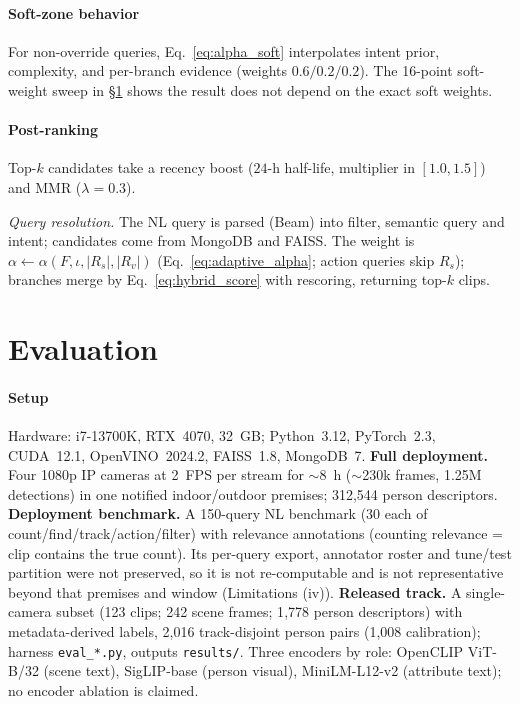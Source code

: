 ﻿\documentclass[conference]{IEEEtran}
\theoremstyle{plain}
\begin{document}
\paragraph*{Soft-zone behavior}
For non-override queries, Eq.~\eqref{eq:alpha_soft} interpolates intent prior, complexity, and per-branch evidence (weights $0.6/\allowbreak 0.2/\allowbreak 0.2$). The 16-point soft-weight sweep in \S\ref{sec:eval} shows the result does not depend on the exact soft weights.

\paragraph*{Post-ranking}
Top-$k$ candidates take a recency boost ($24$-h half-life, multiplier in $[1.0,1.5]$) and MMR ($\lambda{=}0.3$).

\emph{Query resolution.} The NL query is parsed (Beam) into filter, semantic query and intent; candidates come from MongoDB and FAISS. The weight is $\alpha\leftarrow\alpha(F,\iota,|R_s|,|R_v|)$ (Eq.~\eqref{eq:adaptive_alpha}; action queries skip $R_s$); branches merge by Eq.~\eqref{eq:hybrid_score} with rescoring, returning top-$k$ clips.

\section{Evaluation}\label{sec:eval}

\paragraph*{Setup}
Hardware: i7-13700K, RTX~4070, 32~GB; Python~3.12, PyTorch~2.3, CUDA~12.1, OpenVINO~2024.2, FAISS~1.8, MongoDB~7. \textbf{Full deployment.} Four 1080p IP cameras at 2~FPS per stream for $\sim$8~h ($\sim$230k frames, 1.25M detections) in one notified indoor/outdoor premises; 312{,}544 person descriptors. \textbf{Deployment benchmark.} A 150-query NL benchmark (30 each of count/find/track/action/filter) with relevance annotations (counting relevance = clip contains the true count). Its per-query export, annotator roster and tune/test partition were not preserved, so it is not re-computable and is not representative beyond that premises and window (Limitations (iv)). \textbf{Released track.} A single-camera subset (123 clips; 242 scene frames; 1{,}778 person descriptors) with metadata-derived labels, 2{,}016 track-disjoint person pairs (1{,}008 calibration); harness \texttt{eval\_*.py}, outputs \texttt{results/}. Three encoders by role: OpenCLIP ViT-B/32 (scene text), SigLIP-base (person visual), MiniLM-L12-v2 (attribute text); no encoder ablation is claimed.
\end{document}
